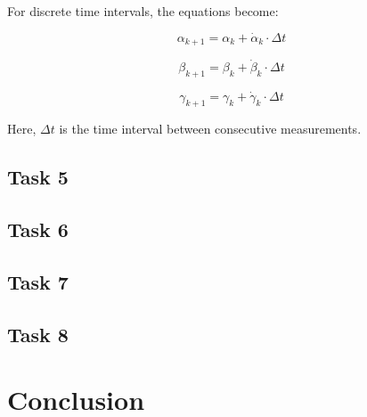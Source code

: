 \documentclass[12pt]{article}
\begin{document}
For discrete time intervals, the equations become:

\begin{equation}
\label{eq:alpha_discrete}
\alpha_{k+1} = \alpha_k + \dot{\alpha}_k \cdot \Delta t
\end{equation}

\begin{equation}
\label{eq:beta_discrete}
\beta_{k+1} = \beta_k + \dot{\beta}_k \cdot \Delta t
\end{equation}

\begin{equation}
\label{eq:gamma_discrete}
\gamma_{k+1} = \gamma_k + \dot{\gamma}_k \cdot \Delta t
\end{equation}

Here, \( \Delta t \) is the time interval between consecutive measurements.

\subsection{Task 5}


\subsection{Task 6}


\subsection{Task 7}


\subsection{Task 8}

\section{Conclusion}






\appendix  
\clearpage
\addappheadtotoc 
\appendixpage 
\end{document}
